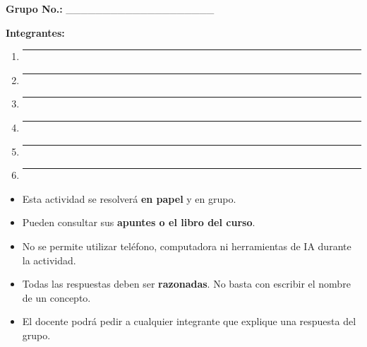 \documentclass[
  spanish,
  letterpaper,
]{scrbook}
\providecommand{\tightlist}{%
  \setlength{\itemsep}{0pt}\setlength{\parskip}{0pt}}
\begin{document}
\textbf{Grupo No.:} \_\_\_\_\_\_\_\_\_\_\_\_\_\_\_\_\_\_\_\_

\textbf{Integrantes:}

\begin{enumerate}
\def\labelenumi{\arabic{enumi}.}
\item
  \begin{center}\rule{0.5\linewidth}{0.5pt}\end{center}
\item
  \begin{center}\rule{0.5\linewidth}{0.5pt}\end{center}
\item
  \begin{center}\rule{0.5\linewidth}{0.5pt}\end{center}
\item
  \begin{center}\rule{0.5\linewidth}{0.5pt}\end{center}
\item
  \begin{center}\rule{0.5\linewidth}{0.5pt}\end{center}
\item
  \begin{center}\rule{0.5\linewidth}{0.5pt}\end{center}
\end{enumerate}

\begin{tcolorbox}[enhanced jigsaw, arc=.35mm, bottomrule=.15mm, bottomtitle=1mm, breakable, colback=white, colbacktitle=quarto-callout-important-color!10!white, colframe=quarto-callout-important-color-frame, coltitle=black, left=2mm, leftrule=.75mm, opacityback=0, opacitybacktitle=0.6, rightrule=.15mm, title=\textcolor{quarto-callout-important-color}{\faExclamation}\hspace{0.5em}{Reglas de trabajo}, titlerule=0mm, toprule=.15mm, toptitle=1mm]

\begin{itemize}
\tightlist
\item
  Esta actividad se resolverá \textbf{en papel} y en grupo.
\item
  Pueden consultar sus \textbf{apuntes o el libro del curso}.
\item
  No se permite utilizar teléfono, computadora ni herramientas de IA
  durante la actividad.
\item
  Todas las respuestas deben ser \textbf{razonadas}. No basta con
  escribir el nombre de un concepto.
\item
  El docente podrá pedir a cualquier integrante que explique una
  respuesta del grupo.
\end{itemize}

\end{tcolorbox}
\end{document}

